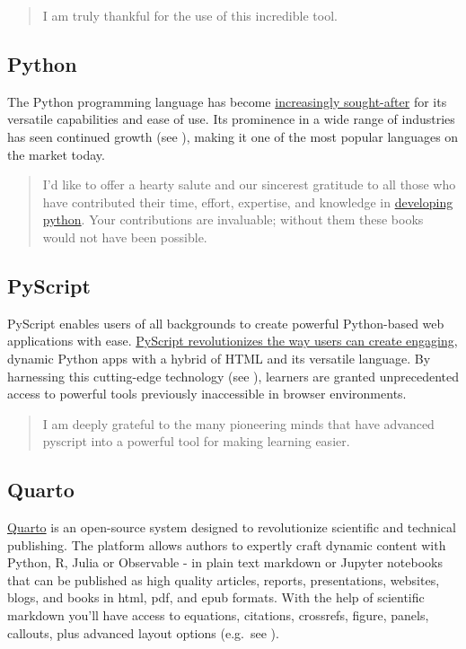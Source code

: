 \documentclass[
  twoside,
  12pt,
  letterpaper,
  fleqn]{article}
\begin{document}
\begin{quote}
I am truly thankful for the use of this incredible tool.
\end{quote}

\hypertarget{python}{%
\subsection{Python}\label{python}}

The Python programming language has become
\href{https://pypl.github.io/PYPL.html}{increasingly sought-after} for
its versatile capabilities and ease of use. Its prominence in a wide
range of industries has seen continued growth (see
\textcite{Millman2011}), making it one of the most popular languages on
the market today.

\begin{quote}
I'd like to offer a hearty salute and our sincerest gratitude to all
those who have contributed their time, effort, expertise, and knowledge
in \href{https://www.python.org}{developing python}. Your contributions
are invaluable; without them these books would not have been possible.
\end{quote}

\hypertarget{pyscript}{%
\subsection{PyScript}\label{pyscript}}

PyScript enables users of all backgrounds to create powerful
Python-based web applications with ease.
\href{https://pyscript.net}{PyScript revolutionizes the way users can
create engaging}, dynamic Python apps with a hybrid of HTML and its
versatile language. By harnessing this cutting-edge technology (see
\textcite{Arepalli2022}), learners are granted unprecedented access to
powerful tools previously inaccessible in browser environments.

\begin{quote}
I am deeply grateful to the many pioneering minds that have advanced
pyscript into a powerful tool for making learning easier.
\end{quote}

\hypertarget{quarto}{%
\subsection{Quarto}\label{quarto}}

\href{https://quarto.org}{Quarto} is an open-source system designed to
revolutionize scientific and technical publishing. The platform allows
authors to expertly craft dynamic content with Python, R, Julia or
Observable - in plain text markdown or Jupyter notebooks that can be
published as high quality articles, reports, presentations, websites,
blogs, and books in html, pdf, and epub formats. With the help of
scientific markdown you'll have access to equations, citations,
crossrefs, figure, panels, callouts, plus advanced layout options
(e.g.~see \textcite{aust}).
\end{document}
